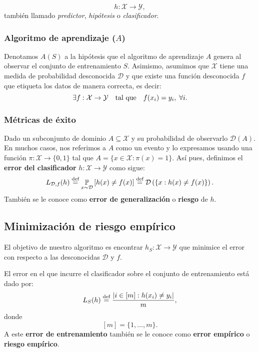 \documentclass[8pt,a4paper]{extarticle}
\begin{document}
\begin{multicols}{3}
$$h : \mathcal{X} \to \mathcal{Y},$$ también llamado \emph{predictor}, \emph{hipótesis} o \emph{clasificador}.

\subsubsection*{Algoritmo de aprendizaje ($A$)}

Denotamos $A(S)$ a la hipótesis que el algoritmo de aprendizaje $A$ genera al observar el conjunto de entrenamiento $S$. Asimismo, asumimos que $\mathcal{X}$ tiene una medida de probabilidad desconocida $\mathcal{D}$ y que existe una función desconocida $f$ que etiqueta los datos de manera correcta, es decir:
\[
	\exists f:\mathcal{X}\to \mathcal{Y}\quad \text{\normalfont tal que} \quad f(x_i) = y_i,\; \forall i
.\] 

\subsubsection*{Métricas de éxito}

\begin{boxdef}
	Dado un subconjunto de dominio $A \subseteq \mathcal{X}$ y su probabilidad de observarlo $\mathcal{D}(A)$. En muchos casos, nos referimos a $A$ como un evento y lo expresamos usando una función $\pi : \mathcal{X} \to \{0,1\}$ tal que $A = \{x \in \mathcal{X} : \pi(x) = 1\} $. Así pues, definimos el \textbf{error del clasificador} $h : \mathcal{X} \to \mathcal{Y}$ como sigue:
	\[
		L_{\mathcal{D}, f} (h) \stackrel{\text{\normalfont def}}{=} \underset{x \sim \mathcal{D}}{\mathbb{P}} \left[ h(x) \neq f(x) \right] \stackrel{\text{\normalfont def}}{=} \mathcal{D}\left( \{x : h(x) \neq f(x)\}  \right) 
	.\]
	También se le conoce como \textbf{error de generalización} o \textbf{riesgo} de $h$.
\end{boxdef}

\subsection{Minimización de riesgo empírico}

El objetivo de nuestro algoritmo es encontrar $h_S : \mathcal{X} \to \mathcal{Y}$ que minimice el error con respecto a las desconocidas $\mathcal{D}$ y $f$.

\begin{boxdef}
	El error en el que incurre el clasificador sobre el conjunto de entrenamiento está dado por:
	\[
		L_S (h) \stackrel{\text{\normalfont def}}{=} \frac{\left| i \in [m] : h(x_i) \neq y_i \right| }{m}
	,\] 
	donde
	\[
		[m] = \{1,\ldots, m\} 
	.\] 
	A este \textbf{error de entrenamiento} también se le conoce como \textbf{error empírico} o \textbf{riesgo empírico}.
\end{boxdef}


\end{multicols}
\end{document}
